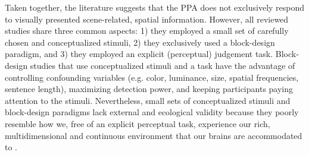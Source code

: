 \documentclass[english,11pt]{article}
\begin{document}
Taken together, the literature suggests that the PPA does not exclusively respond
to visually presented scene-related, spatial information.
However, all reviewed studies share three common aspects:
1) they employed a small set of carefully chosen and conceptualized stimuli,
2) they exclusively used a block-design paradigm, and
3) they employed an explicit (perceptual) judgement task.
Block-design studies that use conceptualized stimuli and a task have the
advantage of controlling confounding variables (e.g. color, luminance, size,
spatial frequencies, sentence length), maximizing detection power, and keeping
participants paying attention to the stimuli.
Nevertheless, small sets of conceptualized stimuli and block-design paradigms
lack external and ecological validity \citep{westfall2016fixing,
hasson2004intersubject} because they poorly resemble how we, free of an explicit
perceptual task, experience our rich, multidimensional and continuous
environment that our brains are accommodated to
\citep{sonkusare2019naturalistic}.
\end{document}
